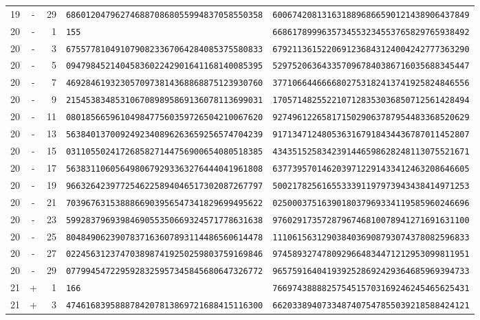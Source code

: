 \begin{longtable}{@{}rcrll@{}}
19&-&29&\texttt{6860120479627468870868055994837058550358}&\texttt{6006742081316318896866590121438906437849}\\
20&-&1&\texttt{155}&\texttt{6686178999635734553234553765829765938492}\\
20&-&3&\texttt{6755778104910790823367064284085375580833}&\texttt{6792113615220691236843124004242777363290}\\
20&-&5&\texttt{0947984521404583602242901641168140085395}&\texttt{5297520636433570967840386716035688345447}\\
20&-&7&\texttt{4692846193230570973814368868875123930760}&\texttt{3771066446666802753182413741925824846556}\\
20&-&9&\texttt{2154538348531067089895869136078113699031}&\texttt{1705714825522107128353036850712561428494}\\
20&-&11&\texttt{0801856659610498477560359726504210067620}&\texttt{9274961226581715029063787954483368520629}\\
20&-&13&\texttt{5638401370092492340896263659256574704239}&\texttt{9171347124805363167918434436787011452807}\\
20&-&15&\texttt{0311055024172685827144756900654080518385}&\texttt{4343515258342391446598628248113075521671}\\
20&-&17&\texttt{5638311060564980679293363276444041961808}&\texttt{6377395701462039712291433412463208646605}\\
20&-&19&\texttt{9663264239772546225894046517302087267797}&\texttt{5002178256165533391197973943438414971253}\\
20&-&21&\texttt{7039676315388866903956547341829699495622}&\texttt{0250003751639018037969334119585960246696}\\
20&-&23&\texttt{5992837969398469055350669324571778631638}&\texttt{9760291735728796746810078941271691631100}\\
20&-&25&\texttt{8048490623907837163607893114486560614478}&\texttt{1110615631290384036908793074378082596833}\\
20&-&27&\texttt{0224563123747038987419250259803759169846}&\texttt{9745893274780929664834471212953099811951}\\
20&-&29&\texttt{0779945472295928325957345845680647326772}&\texttt{9657591640419392528692429364685969394733}\\
21&+&1&\texttt{166}&\texttt{7669743888825754515703169246245465625431}\\
21&+&3&\texttt{4746168395888784207813869721688415116300}&\texttt{6620338940733487407547855039218588424121}\\

\end{longtable}
